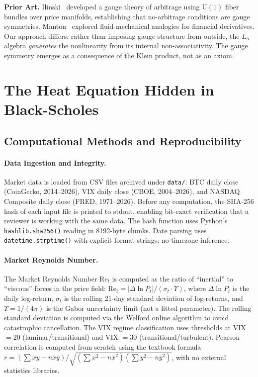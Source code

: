 \label{ch:markets}
\noindent\textbf{Prior Art.} Ilinski~\cite{ilinski1997} developed a gauge theory of arbitrage using $\mathrm{U}(1)$ fiber bundles over price manifolds, establishing that no-arbitrage conditions are gauge symmetries. Manton~\cite{manton2002} explored fluid-mechanical analogies for financial derivatives. Our approach differs: rather than imposing gauge structure from outside, the $L_5$ algebra \emph{generates} the nonlinearity from its internal non-associativity. The gauge symmetry emerges as a consequence of the Klein product, not as an axiom.

\section{The Heat Equation Hidden in Black-Scholes}


\subsection{Computational Methods and Reproducibility}

\paragraph{Data Ingestion and Integrity.}
Market data is loaded from CSV files archived under \texttt{data/}: BTC daily close (CoinGecko, 2014--2026), VIX daily close (CBOE, 2004--2026), and NASDAQ Composite daily close (FRED, 1971--2026). Before any computation, the SHA-256 hash of each input file is printed to stdout, enabling bit-exact verification that a reviewer is working with the same data. The hash function uses Python's \texttt{hashlib.sha256()} reading in 8192-byte chunks. Date parsing uses \texttt{datetime.strptime()} with explicit format strings; no timezone inference.

\paragraph{Market Reynolds Number.}
The Market Reynolds Number $\mathrm{Re}_t$ is computed as the ratio of ``inertial'' to ``viscous'' forces in the price field: $\mathrm{Re}_t = |\Delta \ln P_t| / (\sigma_t \cdot \Upsilon)$, where $\Delta \ln P_t$ is the daily log-return, $\sigma_t$ is the rolling 21-day standard deviation of log-returns, and $\Upsilon = 1/(4\pi)$ is the Gabor uncertainty limit (not a fitted parameter). The rolling standard deviation is computed via the Welford online algorithm to avoid catastrophic cancellation. The VIX regime classification uses thresholds at VIX $= 20$ (laminar/transitional) and VIX $= 30$ (transitional/turbulent). Pearson correlation is computed from scratch using the textbook formula $r = (\sum xy - n\bar{x}\bar{y}) / \sqrt{(\sum x^2 - n\bar{x}^2)(\sum y^2 - n\bar{y}^2)}$, with no external statistics libraries.

